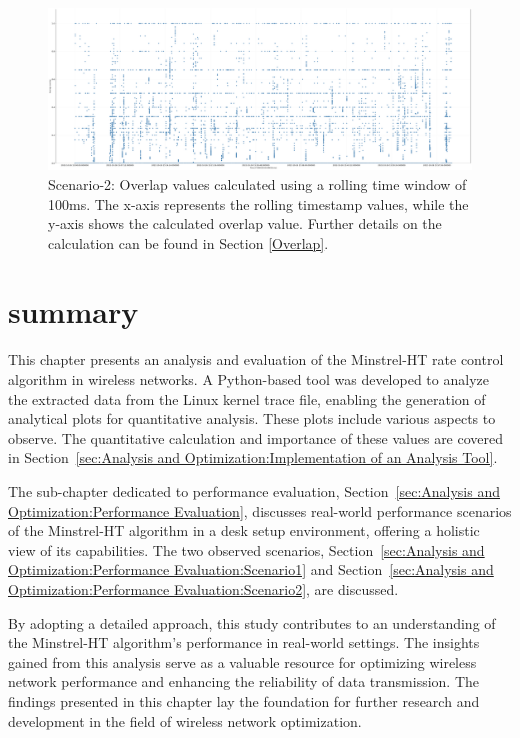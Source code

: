 \begin{landscape}
\begin{figure}[hbt!]
  \raggedright
  \includegraphics[width=1.45\textwidth, height=\textheight, keepaspectratio]{figures/plots/Scenario-2/G2-overlap.png}
  \caption[Overlap of Packet Success \& Failure with Rolling Time Average]{Scenario-2: Overlap values calculated using a rolling time window of 100ms. The x-axis represents the rolling timestamp values, while the y-axis shows the calculated overlap value. Further details on the calculation can be found in Section \ref{Overlap}.}
  \label{fig:overlap2}
\end{figure}
\FloatBarrier 
\end{landscape}

\section{summary}
This chapter presents an analysis and evaluation of the Minstrel-HT rate control algorithm in wireless networks. A Python-based tool was developed to analyze the extracted data from the Linux kernel trace file, enabling the generation of analytical plots for quantitative analysis. These plots include various aspects to observe. The quantitative calculation and importance of these values are covered in Section~\ref{sec:Analysis and Optimization:Implementation of an Analysis Tool}.

The sub-chapter dedicated to performance evaluation, Section~\ref{sec:Analysis and Optimization:Performance Evaluation}, discusses real-world performance scenarios of the Minstrel-HT algorithm in a desk setup environment, offering a holistic view of its capabilities. The two observed scenarios, Section~\ref{sec:Analysis and Optimization:Performance Evaluation:Scenario1} and Section~\ref{sec:Analysis and Optimization:Performance Evaluation:Scenario2}, are discussed.

By adopting a detailed approach, this study contributes to an understanding of the Minstrel-HT algorithm's performance in real-world settings. The insights gained from this analysis serve as a valuable resource for optimizing wireless network performance and enhancing the reliability of data transmission. The findings presented in this chapter lay the foundation for further research and development in the field of wireless network optimization.